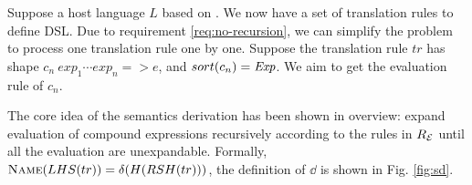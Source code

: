 
Suppose a host language $L$ based on \STLC{}. %
We now have a set of translation rules to define DSL.
Due to requirement \ref{req:no-recursion},
 we can simplify the problem to process one translation rule one by one.
Suppose the translation rule $tr$ has shape $c_n~exp_1\cdots exp_n => e$,
 and $sort(c_n)=\mathit{Exp}$.
We aim to get the evaluation rule of $c_n$.

The core idea of the semantics derivation has been shown in overview:
 expand evaluation of compound expressions recursively according to the rules in $R_{\mathcal{E}}$
 until all the evaluation are unexpandable.
Formally, $\textsc{Name}({LHS(tr)})=\delta(H(RSH(tr)))$, the definition of $\dd$ is shown in Fig. \ref{fig:sd}.

